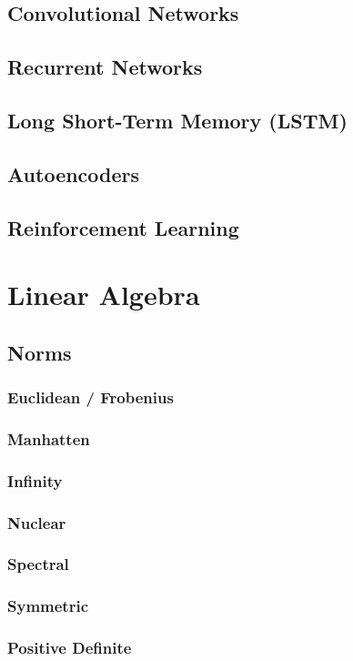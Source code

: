 \documentclass[11pt]{article}
\begin{document}
\subsection{Convolutional Networks}
\subsection{Recurrent Networks}
\subsection{Long Short-Term Memory (LSTM)}
\subsection{Autoencoders}
\subsection{Reinforcement Learning}

\section{Linear Algebra}
\subsection{Norms}
\subsubsection{Euclidean / Frobenius}
\subsubsection{Manhatten}
\subsubsection{Infinity}
\subsubsection{Nuclear}
\subsubsection{Spectral}
\subsubsection{Symmetric}
\subsubsection{Positive Definite}
\end{document}

